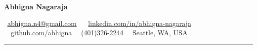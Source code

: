 \documentclass[11pt,letterpaper,hidelinks]{article}
\begin{document}
\begin{center}
{\LARGE \textbf{Abhigna Nagaraja}}

\vspace{0pt}
\small \raisebox{-0.25ex}\Email\ \href{mailto:abhigna.n4@gmail.com}{abhigna.n4@gmail.com}
\ \textbullet\ \small {} \href{https:// www.linkedin.com/in/abhigna-nagaraja}{linkedin.com/in/abhigna-nagaraja}
\ \textbullet\ \small {}\href{https://github.com/abhigna}{github.com/abhigna} 
\ \textbullet\ \small  \href{tel:+14013262244}{(401)326-2244}
\ \textbullet\ \small Seattle, WA, USA

\vspace{-6pt}
\end{center}




\hrule
\end{document}

